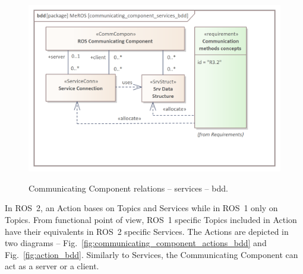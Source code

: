 \documentclass{ieeeaccess}
\begin{document}
	\begin{figure}[htb]
		\centering
		\begin{center}
			{\includegraphics[scale=0.69]{img/meros_pkg/communicating_component_services_bdd.png}}
		\end{center}
		\caption{Communicating Component relations -- services -- bdd.} 
		\label{fig:communication_blocks_services_bdd}
	\end{figure}
	
	In ROS~2, an Action bases on Topics and Services while in ROS~1 only on Topics. From functional point of view, ROS~1 specific Topics included in Action have their equivalents in ROS~2 specific Services. The Actions are depicted in two diagrams -- Fig.~\ref{fig:communicating_component_actions_bdd} and Fig.~\ref{fig:action_bdd}. Similarly to Services, the Communicating Component can act as a server or a client.	 
	
\end{document}
